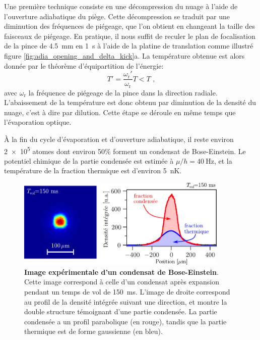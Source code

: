 Une première technique consiste en une décompression du nuage à l'aide de l'ouverture adiabatique du piège. Cette décompression se traduit par une diminution des fréquences de piégeage, que l'on obtient en changeant la taille des faisceaux de piégeage. En pratique, il nous suffit de reculer le plan de focalisation de la pince de \SI{4.5}{\milli\metre} en \SI{1}{\second} à l'aide de la platine de translation comme illustré figure \ref{fig:adia_opening_and_delta_kick}a. La température obtenue est alors donnée par le théorème d'équipartition de l'énergie:
\begin{equation}
T'=\frac{\omega_{\mathrm{r}}'}{\omega_{\mathrm{r}}}T < T \text{ ,}
\end{equation}
avec $\omega_{\mathrm{r}}$ la fréquence de piégeage de la pince dans la direction radiale. L'abaissement de la température est donc obtenu par diminution de la densité du nuage, c'est à dire par dilution. Cette étape se déroule en même temps que l'évaporation optique.

À la fin du cycle d'évaporation et d'ouverture adiabatique, il reste environ \num{2e5} atomes dont environ 50\% forment un condensat de Bose-Einstein. Le potentiel chimique de la partie condensée est estimée à $\mu/h=\SI{40}{\hertz}$, et la température de la fraction thermique est d'environ \SI{5}{\nano\kelvin}. 

\begin{figure}
\centering
\includegraphics[width=0.9\textwidth]{Fig/BEC_manip/BEC_double_struct.pdf}
\caption{\textbf{Image expérimentale d'un condensat de Bose-Einstein}. Cette image correspond à celle d'un condensat après expansion pendant un temps de vol de \SI{150}{\milli\second}. L'image de droite correspond au profil de la densité intégrée suivant une direction, et montre la double structure témoignant d'une partie condensée. La partie condensée a un profil parabolique (en rouge), tandis que la partie thermique est de forme gaussienne (en bleu).}
\label{fig:BEC_double_struct}
\end{figure}

